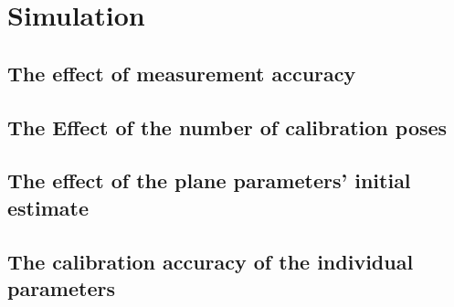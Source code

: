 \section{Simulation}
\label{sec:simulation}


\subsection{The effect of measurement accuracy}
\label{sec:meas_accuracy}







\subsection{The Effect of the number of calibration poses}
\label{sec:calib_poses}





\subsection{The effect of the plane parameters' initial estimate}
\label{sec:plane_params}







\subsection{The calibration accuracy of the individual parameters}
\label{sec:individual_params}





